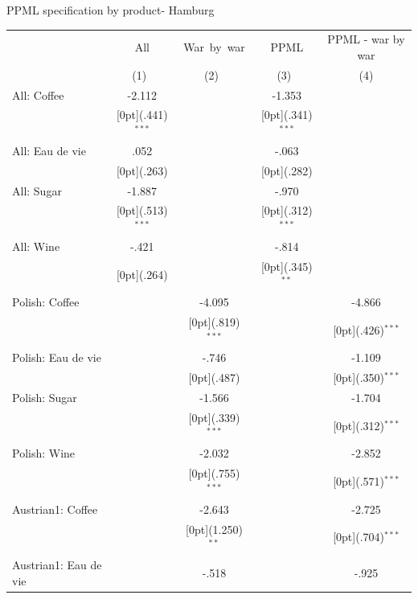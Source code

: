 \documentclass[12pt,a4paper,titlepage]{article}
\begin{document}
{\newpage
\caption{PPML specification by product- Hamburg }
\begin{tabular*}{\textwidth}{@{\extracolsep{\fill}}lcccc}				
	& \multicolumn{1}{c}{All} &	\multicolumn{1}{c}{War~by~war} &	\multicolumn{1}{c}{PPML} &	\multicolumn{1}{c}{PPML - war by war} \\
\cline{2-5}				
	& \multicolumn{1}{c}{(1)\mbox{\ }} &	\multicolumn{1}{c}{(2)\mbox{\ }} &	\multicolumn{1}{c}{(3)\mbox{\ }} &	\multicolumn{1}{c}{(4)} \\
\hline				
All: Coffee &	-2.112 &	&	-1.353 &	\\
&	\raisebox{.7ex}[0pt]{\scriptsize (.441)$^{***}$} &	&	\raisebox{.7ex}[0pt]{\scriptsize (.341)$^{***}$} &	\\
All: Eau de vie &	.052 &	&	-.063 &	\\
&	\raisebox{.7ex}[0pt]{\scriptsize (.263)} &	&	\raisebox{.7ex}[0pt]{\scriptsize (.282)} &	\\
All: Sugar &	-1.887 &	&	-.970 &	\\
&	\raisebox{.7ex}[0pt]{\scriptsize (.513)$^{***}$} &	&	\raisebox{.7ex}[0pt]{\scriptsize (.312)$^{***}$} &	\\
All: Wine &	-.421 &	&	-.814 &	\\
&	\raisebox{.7ex}[0pt]{\scriptsize (.264)} &	&	\raisebox{.7ex}[0pt]{\scriptsize (.345)$^{**}$} &	\\
Polish: Coffee &	&	-4.095 &	&	-4.866 \\
&	&	\raisebox{.7ex}[0pt]{\scriptsize (.819)$^{***}$} &	&	\raisebox{.7ex}[0pt]{\scriptsize (.426)$^{***}$} \\
Polish: Eau de vie &	&	-.746 &	&	-1.109 \\
&	&	\raisebox{.7ex}[0pt]{\scriptsize (.487)} &	&	\raisebox{.7ex}[0pt]{\scriptsize (.350)$^{***}$} \\
Polish: Sugar &	&	-1.566 &	&	-1.704 \\
&	&	\raisebox{.7ex}[0pt]{\scriptsize (.339)$^{***}$} &	&	\raisebox{.7ex}[0pt]{\scriptsize (.312)$^{***}$} \\
Polish: Wine &	&	-2.032 &	&	-2.852 \\
&	&	\raisebox{.7ex}[0pt]{\scriptsize (.755)$^{***}$} &	&	\raisebox{.7ex}[0pt]{\scriptsize (.571)$^{***}$} \\
Austrian1: Coffee &	&	-2.643 &	&	-2.725 \\
&	&	\raisebox{.7ex}[0pt]{\scriptsize (1.250)$^{**}$} &	&	\raisebox{.7ex}[0pt]{\scriptsize (.704)$^{***}$} \\
Austrian1: Eau de vie &	&	-.518 &	&	-.925 \\

\end{tabular*}}
\end{document}
